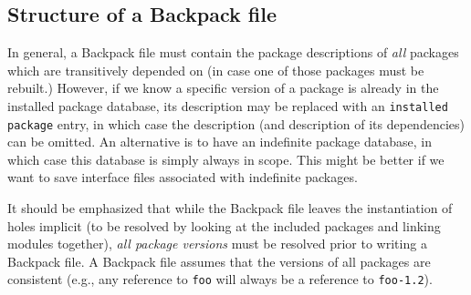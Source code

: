 \documentclass{article}
\newcommand{\Red}[1]{{\color{red} #1}}
\begin{document}
\subsection{Structure of a Backpack file}

In general, a Backpack file must contain the package descriptions of
\emph{all} packages which are transitively depended on (in case
one of those packages must be rebuilt.)  However, if we know a specific
version of a package is already in the installed package database,
its description may be replaced with an \texttt{installed package}
entry, in which case the description (and description of its dependencies)
can be omitted.  \Red{An alternative is to have an indefinite package
database, in which case this database is simply always in scope.  This
might be better if we want to save interface files associated with indefinite
packages.}

It should be emphasized that while the Backpack file leaves the instantiation
of holes implicit (to be resolved by looking at the included packages and
linking modules together), \emph{all package versions} must be resolved
prior to writing a Backpack file.  A Backpack file assumes that the
versions of all packages are consistent (e.g., any reference to \texttt{foo}
will always be a reference to \texttt{foo-1.2}).

\end{document}

